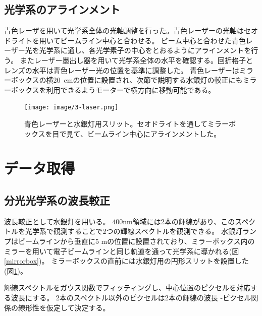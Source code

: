 \documentclass[a4paper,11pt,uplatex]{jsbook}
\begin{document}
\subsection{光学系のアラインメント}
青色レーザを用いて光学系全体の光軸調整を行った。青色レーザーの光軸はセオドライトを用いてビームライン中心と合わせる。
ビーム中心と合わせた青色レーザー光を光学系に通し、各光学素子の中心をとおるようにアラインメントを行う。
またレーザー墨出し器を用いて光学系全体の水平を確認する。回折格子とレンズの水平は青色レーザー光の位置を基準に調整した。
青色レーザーはミラーボックスの横20~cmの位置に設置され、次節で説明する水銀灯の較正にもミラーボックスを利用できるようモーターで横方向に移動可能である。
\begin{figure}
  \centering
  \texttt{[image: image/3-laser.png]}\\
  \caption[青色レーザー]{青色レーザーと水銀灯用スリット。セオドライトを通してミラーボックスを目で見て、ビームライン中心にアラインメントした。}
  \label{laser}
\end{figure}
\section{データ取得}


\subsection{分光光学系の波長較正}
波長較正として水銀灯を用いる。
$400 \text{nm}$領域には2本の輝線があり、このスペクトルを光学系で観測することで2つの輝線スペクトルを観測できる。
水銀灯ランプはビームラインから垂直に5 mの位置に設置されており、ミラーボックス内のミラーを用いて電子ビームラインと同じ軌道を通って光学系に導かれる(図\ref{mirrorbox})。
ミラーボックスの直前には水銀灯用の円形スリットを設置した(図\ref{laser})。

輝線スペクトルをガウス関数でフィッティングし、中心位置のピクセルを対応する波長にする。
2本のスペクトル以外のピクセルは2本の輝線の波長 -ピクセル関係の線形性を仮定して決定する。
\end{document}
